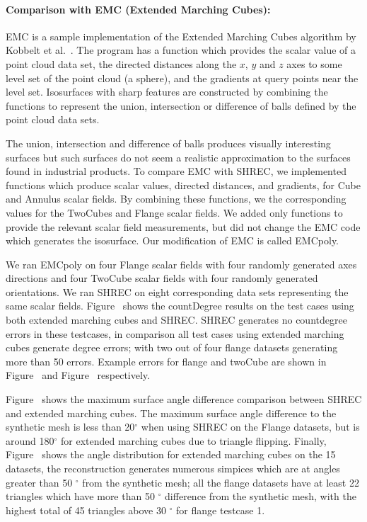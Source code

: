 \paragraph{Comparison with EMC (Extended Marching Cubes):}

EMC is a sample implementation of the Extended Marching Cubes algorithm by Kobbelt et al.~\cite{kbsh-fssev-01}.
The program has a function which provides the scalar value of a point cloud data set,
the directed distances along the $x$, $y$ and $z$ axes to some level set of the point cloud (a sphere),
and the gradients at query points near the level set.
Isosurfaces with sharp features are constructed by combining the functions
to represent the union, intersection or difference of balls 
defined by the point cloud data sets.

The union, intersection and difference of balls produces visually interesting surfaces
but such surfaces do not seem a realistic approximation to the surfaces found in industrial products.
To compare EMC with SHREC, we implemented functions which produce scalar values, directed distances,
and gradients, for Cube and Annulus scalar fields.
By combining these functions,
we the corresponding values for the TwoCubes and Flange scalar fields.
We added only functions to provide the relevant scalar field measurements,
but did not change the EMC code which generates the isosurface.
Our modification of EMC is called EMCpoly.

We ran EMCpoly on four Flange scalar fields with four randomly generated axes directions
and four TwoCube scalar fields with four randomly generated orientations.
We ran SHREC on eight corresponding data sets representing the same scalar fields.
Figure~\protect{} shows the countDegree
results on the test cases using both extended marching cubes and
SHREC. 
SHREC generates no countdegree errors in these testcases, in
comparison all test cases using extended marching cubes generate
degree errors; with two out of four flange datasets generating more
than 50 errors.  Example errors for flange and twoCube are shown in
Figure~\protect{} and
Figure~\protect{} respectively.

Figure~\protect{} shows the maximum surface angle difference comparison between SHREC and extended marching cubes. The maximum surface angle difference to the synthetic mesh is less than 20$^\circ$ when using SHREC on the Flange datasets, but is around 180$^\circ$ for extended marching cubes due to triangle flipping. Finally, Figure~\protect{} shows the angle distribution for extended marching cubes on the 15 datasets, the reconstruction generates numerous simpices which are at angles greater than 50 $^\circ$ from the synthetic mesh; all the flange datasets have at least 22 triangles which have more than 50  $^\circ$ difference from the synthetic mesh, with the highest total of 45 triangles above 30 $^\circ$ for flange testcase 1.


